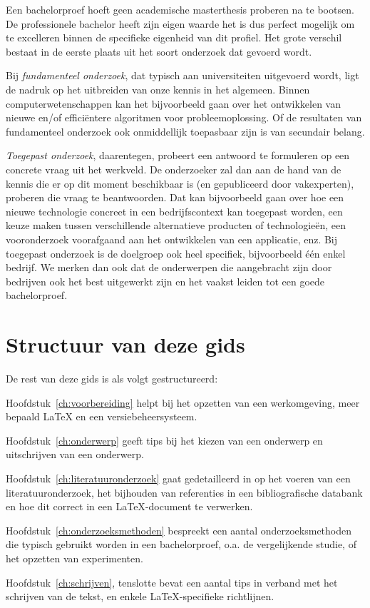 Een bachelorproef hoeft geen academische masterthesis proberen na te bootsen. De professionele bachelor heeft zijn eigen waarde het is dus perfect mogelijk om te excelleren binnen de specifieke eigenheid van dit profiel. Het grote verschil bestaat in de eerste plaats uit het soort onderzoek dat gevoerd wordt.

Bij \emph{fundamenteel onderzoek}, dat typisch aan universiteiten uitgevoerd wordt, ligt de nadruk op het uitbreiden van onze kennis in het algemeen. Binnen computerwetenschappen kan het bijvoorbeeld gaan over het ontwikkelen van nieuwe en/of efficiëntere algoritmen voor probleemoplossing. Of de resultaten van fundamenteel onderzoek ook onmiddellijk toepasbaar zijn is van secundair belang.

\emph{Toegepast onderzoek}, daarentegen, probeert een antwoord te formuleren op een concrete vraag uit het werkveld. De onderzoeker zal dan aan de hand van de kennis die er op dit moment beschikbaar is (en gepubliceerd door vakexperten), proberen die vraag te beantwoorden. Dat kan bijvoorbeeld gaan over hoe een nieuwe technologie concreet in een bedrijfscontext kan toegepast worden, een keuze maken tussen verschillende alternatieve producten of technologieën, een vooronderzoek voorafgaand aan het ontwikkelen van een applicatie, enz. Bij toegepast onderzoek is de doelgroep ook heel specifiek, bijvoorbeeld één enkel bedrijf. We merken dan ook dat de onderwerpen die aangebracht zijn door bedrijven ook het best uitgewerkt zijn en het vaakst leiden tot een goede bachelorproef.

\section{Structuur van deze gids}
\label{sec:structuur}

De rest van deze gids is als volgt gestructureerd:

Hoofdstuk~\ref{ch:voorbereiding} helpt bij het opzetten van een werkomgeving, meer bepaald {\LaTeX} en een versiebeheersysteem.

Hoofdstuk~\ref{ch:onderwerp} geeft tips bij het kiezen van een onderwerp en uitschrijven van een onderwerp.

Hoofdstuk~\ref{ch:literatuuronderzoek} gaat gedetailleerd in op het voeren van een literatuuronderzoek, het bijhouden van referenties in een bibliografische databank en hoe dit correct in een {\LaTeX}-document te verwerken.

Hoofdstuk~\ref{ch:onderzoeksmethoden} bespreekt een aantal onderzoeksmethoden die typisch gebruikt worden in een bachelorproef, o.a. de vergelijkende studie, of het opzetten van experimenten.

Hoofdstuk~\ref{ch:schrijven}, tenslotte bevat een aantal tips in verband met het schrijven van de tekst, en enkele {\LaTeX}-specifieke richtlijnen.
